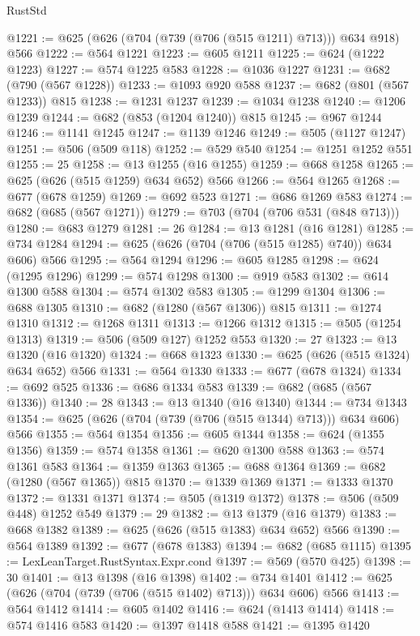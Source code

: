 \begin{lexlean}{RustStd}
\begin{coremodule}
@1221 := @625 (@626 (@704 (@739 (@706 (@515 @1211) @713))) @634 @918) @566
@1222 := @564 @1221
@1223 := @605 @1211
@1225 := @624 (@1222 @1223)
@1227 := @574 @1225 @583
@1228 := @1036 @1227
@1231 := @682 (@790 (@567 @1228))
@1233 := @1093 @920 @588
@1237 := @682 (@801 (@567 @1233)) @815
@1238 := @1231 @1237
@1239 := @1034 @1238
@1240 := @1206 @1239
@1244 := @682 (@853 (@1204 @1240)) @815
@1245 := @967 @1244
@1246 := @1141 @1245
@1247 := @1139 @1246
@1249 := @505 (@1127 @1247)
@1251 := @506 (@509 @118)
@1252 := @529 @540
@1254 := @1251 @1252 @551
@1255 := 25
@1258 := @13 @1255 (@16 @1255)
@1259 := @668 @1258
@1265 := @625 (@626 (@515 @1259) @634 @652) @566
@1266 := @564 @1265
@1268 := @677 (@678 @1259)
@1269 := @692 @523
@1271 := @686 @1269 @583
@1274 := @682 (@685 (@567 @1271))
@1279 := @703 (@704 (@706 @531 (@848 @713)))
@1280 := @683 @1279
@1281 := 26
@1284 := @13 @1281 (@16 @1281)
@1285 := @734 @1284
@1294 := @625 (@626 (@704 (@706 (@515 @1285) @740)) @634 @606) @566
@1295 := @564 @1294
@1296 := @605 @1285
@1298 := @624 (@1295 @1296)
@1299 := @574 @1298
@1300 := @919 @583
@1302 := @614 @1300 @588
@1304 := @574 @1302 @583
@1305 := @1299 @1304
@1306 := @688 @1305
@1310 := @682 (@1280 (@567 @1306)) @815
@1311 := @1274 @1310
@1312 := @1268 @1311
@1313 := @1266 @1312
@1315 := @505 (@1254 @1313)
@1319 := @506 (@509 @127) @1252 @553
@1320 := 27
@1323 := @13 @1320 (@16 @1320)
@1324 := @668 @1323
@1330 := @625 (@626 (@515 @1324) @634 @652) @566
@1331 := @564 @1330
@1333 := @677 (@678 @1324)
@1334 := @692 @525
@1336 := @686 @1334 @583
@1339 := @682 (@685 (@567 @1336))
@1340 := 28
@1343 := @13 @1340 (@16 @1340)
@1344 := @734 @1343
@1354 := @625 (@626 (@704 (@739 (@706 (@515 @1344) @713))) @634 @606) @566
@1355 := @564 @1354
@1356 := @605 @1344
@1358 := @624 (@1355 @1356)
@1359 := @574 @1358
@1361 := @620 @1300 @588
@1363 := @574 @1361 @583
@1364 := @1359 @1363
@1365 := @688 @1364
@1369 := @682 (@1280 (@567 @1365)) @815
@1370 := @1339 @1369
@1371 := @1333 @1370
@1372 := @1331 @1371
@1374 := @505 (@1319 @1372)
@1378 := @506 (@509 @448) @1252 @549
@1379 := 29
@1382 := @13 @1379 (@16 @1379)
@1383 := @668 @1382
@1389 := @625 (@626 (@515 @1383) @634 @652) @566
@1390 := @564 @1389
@1392 := @677 (@678 @1383)
@1394 := @682 (@685 @1115)
@1395 := LexLeanTarget.RustSyntax.Expr.cond
@1397 := @569 (@570 @425)
@1398 := 30
@1401 := @13 @1398 (@16 @1398)
@1402 := @734 @1401
@1412 := @625 (@626 (@704 (@739 (@706 (@515 @1402) @713))) @634 @606) @566
@1413 := @564 @1412
@1414 := @605 @1402
@1416 := @624 (@1413 @1414)
@1418 := @574 @1416 @583
@1420 := @1397 @1418 @588
@1421 := @1395 @1420

\end{coremodule}
\end{lexlean}
